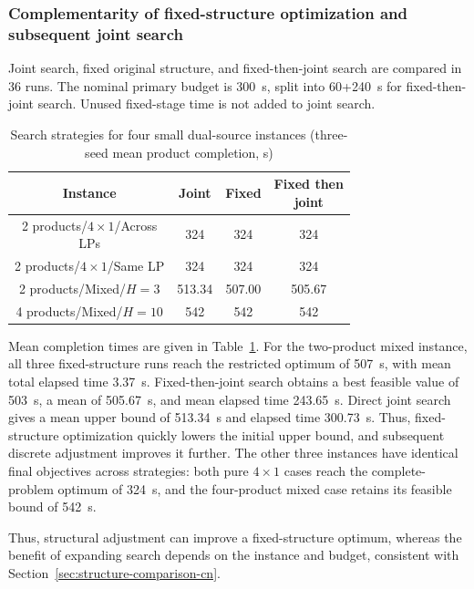 \documentclass[final,5p,times,twocolumn]{elsarticle}
\begin{document}
\subsubsection{Complementarity of fixed-structure optimization and subsequent joint search}
\label{sec:journal-structure-cn}
Joint search, fixed original structure, and fixed-then-joint search are compared in 36 runs. The nominal primary budget is 300~s, split into 60+240~s for fixed-then-joint search. Unused fixed-stage time is not added to joint search.


\begin{table}[!htbp]
\centering\small
\caption{Search strategies for four small dual-source instances (three-seed mean product completion, s)}
\label{tab:journal-structure-cn}
\setlength{\tabcolsep}{3pt}
\begin{tabular}{cccc}\toprule
Instance & Joint & Fixed & \makecell[c]{Fixed then\\joint}\\\midrule
2 products/$4\times1$/\makecell[c]{Across\\LPs} & 324 & 324 & 324\\
2 products/$4\times1$/Same LP & 324 & 324 & 324\\
2 products/Mixed/$H=3$ & 513.34 & 507.00 & 505.67\\
4 products/Mixed/$H=10$ & 542 & 542 & 542\\
\bottomrule\end{tabular}
\end{table}


Mean completion times are given in Table~\ref{tab:journal-structure-cn}. For the two-product mixed instance, all three fixed-structure runs reach the restricted optimum of 507~s, with mean total elapsed time 3.37~s. Fixed-then-joint search obtains a best feasible value of 503~s, a mean of 505.67~s, and mean elapsed time 243.65~s. Direct joint search gives a mean upper bound of 513.34~s and elapsed time 300.73~s. Thus, fixed-structure optimization quickly lowers the initial upper bound, and subsequent discrete adjustment improves it further. The other three instances have identical final objectives across strategies: both pure $4\times1$ cases reach the complete-problem optimum of 324~s, and the four-product mixed case retains its feasible bound of 542~s.

Thus, structural adjustment can improve a fixed-structure optimum, whereas the benefit of expanding search depends on the instance and budget, consistent with Section~\ref{sec:structure-comparison-cn}.
\end{document}
